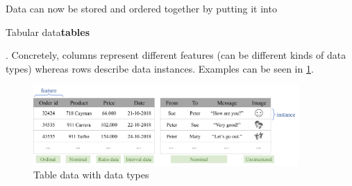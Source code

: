 Data can now be stored and ordered together by putting it into \begin{sidenote}{Tabular data}\textbf{tables}\end{sidenote}. Concretely, columns represent different features (can be different kinds of data types) whereas rows describe data instances. Examples can be seen in \ref{fig:1_table_data}.

\begin{figure}[H]
  \centering
  \includegraphics[width=0.9\textwidth]{assets/basics/table_data.png}
  \caption{Table data with data types}
  \label{fig:1_table_data}
\end{figure}

